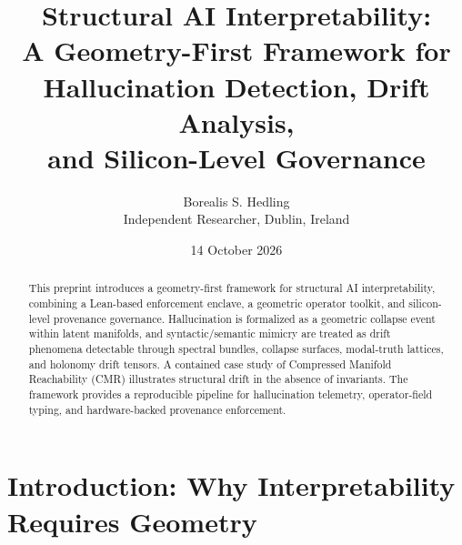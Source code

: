 \usepackage{amsmath, amssymb, amsthm}
\usepackage{geometry}
\usepackage{hyperref}
\usepackage{graphicx}
\usepackage{enumitem}
\usepackage{mathtools}
\usepackage{bm}

\geometry{margin=1in}

\title{Structural AI Interpretability:\\
A Geometry-First Framework for Hallucination Detection, Drift Analysis,\\
and Silicon-Level Governance}

\author{Borealis S. Hedling\\
\small Independent Researcher, Dublin, Ireland}

\date{14 October 2026}



\maketitle

\begin{abstract}
This preprint introduces a geometry-first framework for structural AI interpretability,
combining a Lean-based enforcement enclave, a geometric operator toolkit,
and silicon-level provenance governance. Hallucination is formalized as a geometric
collapse event within latent manifolds, and syntactic/semantic mimicry are treated
as drift phenomena detectable through spectral bundles, collapse surfaces,
modal-truth lattices, and holonomy drift tensors. A contained case study of
Compressed Manifold Reachability (CMR) illustrates structural drift in the absence
of invariants. The framework provides a reproducible pipeline for hallucination
telemetry, operator-field typing, and hardware-backed provenance enforcement.
\end{abstract}

\tableofcontents

\section{Introduction: Why Interpretability Requires Geometry}


